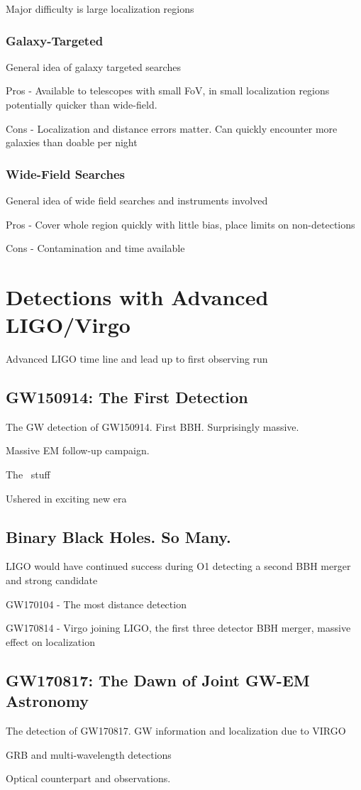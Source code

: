 Major difficulty is large localization regions 

\subsubsection{Galaxy-Targeted}
\label{sec:intro_galaxy}
General idea of galaxy targeted searches

Pros - Available to telescopes with small FoV, in small localization regions potentially quicker than wide-field.

Cons - Localization and distance errors matter. Can quickly encounter more galaxies than doable per night

\subsubsection{Wide-Field Searches}
\label{sec:intro_widefield}
General idea of wide field searches and instruments involved

Pros - Cover whole region quickly with little bias, place limits on non-detections

Cons - Contamination and time available

\section{Detections with Advanced LIGO/Virgo}
\label{sec:intro_history}
Advanced LIGO time line and lead up to first observing run 

\subsection{GW150914: The First Detection}
\label{sec:intro_gw150914}
The GW detection of GW150914. First BBH. Surprisingly massive.

Massive EM follow-up campaign.

The \fermi\ stuff

Ushered in exciting new era

\subsection{Binary Black Holes. So Many.}
LIGO would have continued success during O1 detecting a second BBH merger and strong candidate

GW170104 - The most distance detection

GW170814 - Virgo joining LIGO, the first three detector BBH merger, massive effect on localization 

\subsection{GW170817: The Dawn of Joint GW-EM Astronomy}
The detection of GW170817. GW information and localization due to VIRGO

GRB and multi-wavelength detections

Optical counterpart and observations. 


